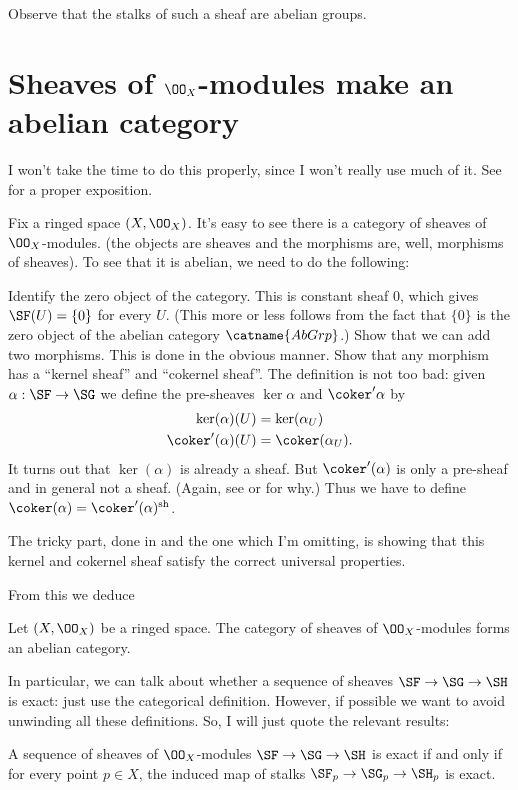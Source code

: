 \documentclass[11pt]{scrreprt}
\begin{document}
Observe that the stalks of such a sheaf are abelian groups.

\section{Sheaves of $\OO_X$-modules make an abelian category}
I won't take the time to do this properly,
since I won't really use much of it.
See \cite{ref:vakil} for a proper exposition.

Fix a ringed space $(X, \OO_X)$.
It's easy to see there is a category of sheaves of $\OO_X$-modules.
(the objects are sheaves and the morphisms are, well, morphisms of sheaves).
To see that it is abelian, we need to do the following:
\begin{itemize}
	\ii Identify the zero object of the category.
	This is constant sheaf $0$, which gives $\SF(U) = \{0\}$ for every $U$.
	(This more or less follows from the fact that $\{0\}$
	is the zero object of the abelian category $\catname{AbGrp}$.)
	\ii Show that we can add two morphisms.
	This is done in the obvious manner.
	\ii Show that any morphism has a ``kernel sheaf'' and ``cokernel sheaf''.
	The definition is not too bad: given $\alpha : \SF \to \SG$ we define the
	pre-sheaves $\ker\alpha$ and $\coker'\alpha$ by
	\begin{align*}
		\ker(\alpha)(U) &= \ker(\alpha_U) \\
		\coker'(\alpha)(U) &= \coker(\alpha_U).
	\end{align*}
	It turns out that $\ker(\alpha)$ is already a sheaf.
	But $\coker'(\alpha)$ is only a pre-sheaf and in general not a sheaf.
	(Again, see \cite{ref:vakil} or \cite{ref:gathmann} for why.)
	Thus we have to define $\coker(\alpha) = \coker'(\alpha) \sh$.
	
	The tricky part, done in \cite{ref:vakil} and the one which I'm omitting,
	is showing that this kernel and cokernel sheaf satisfy
	the correct universal properties.
\end{itemize}

From this we deduce
\begin{theorem}
	Let $(X, \OO_X)$ be a ringed space.
	The category of sheaves of $\OO_X$-modules forms an abelian category.
\end{theorem}

In particular, we can talk about whether a sequence of sheaves
$\SF \to \SG \to \SH$ is exact: just use the categorical definition.
However, if possible we want to avoid unwinding all these definitions.
So, I will just quote the relevant results:
\begin{theorem}
	A sequence of sheaves of $\OO_X$-modules
	$\SF \to \SG \to \SH$ is exact if and only if
	for every point $p \in X$,
	the induced map of stalks $\SF_p \to \SG_p \to \SH_p$ is exact.
\end{theorem}
\end{document}

